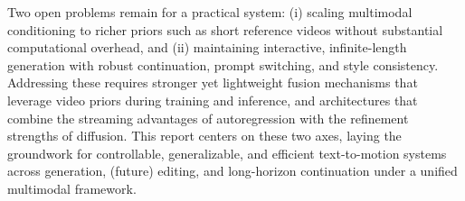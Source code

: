 \documentclass[a4paper,12pt]{article}
\begin{document}
Two open problems remain for a practical system: (i) scaling multimodal conditioning to richer priors such as short reference videos without substantial computational overhead, and (ii) maintaining interactive, infinite-length generation with robust continuation, prompt switching, and style consistency. Addressing these requires stronger yet lightweight fusion mechanisms that leverage video priors during training and inference, and architectures that combine the streaming advantages of autoregression with the refinement strengths of diffusion. This report centers on these two axes, laying the groundwork for controllable, generalizable, and efficient text-to-motion systems across generation, (future) editing, and long-horizon continuation under a unified multimodal framework.






\end{document}
